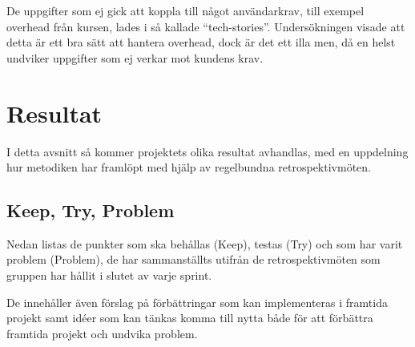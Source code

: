 \documentclass[conference,a4paper]{IEEEtran}
\begin{document}
De uppgifter som ej gick att koppla till något användarkrav, till exempel overhead från kursen, lades i så kallade ``tech-stories''. Undersökningen visade att detta är ett bra sätt att hantera overhead, dock är det ett illa men, då en helst undviker uppgifter som ej verkar mot kundens krav.

\section{Resultat} \label{sec:res}
I detta avsnitt så kommer projektets olika resultat avhandlas, med en uppdelning hur metodiken har framlöpt med hjälp av regelbundna retrospektivmöten.

\subsection{Keep, Try, Problem}
Nedan listas de punkter som ska behållas (Keep), testas (Try) och som har varit problem (Problem), de har sammanställts utifrån de retrospektivmöten som gruppen har hållit i slutet av varje sprint. 

De innehåller även förslag på förbättringar som kan implementeras i framtida projekt samt idéer som kan tänkas komma till nytta både för att förbättra framtida projekt och undvika problem.
\end{document}
